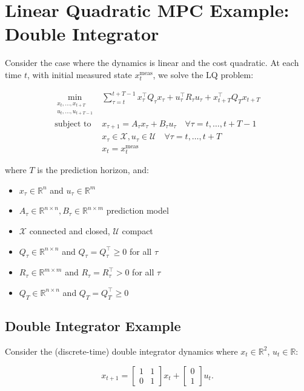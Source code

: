 \documentclass[openany]{book}
\theoremstyle{definition}
\theoremstyle{remark}
\begin{document}
\section{Linear Quadratic MPC Example: Double Integrator}

Consider the case where the dynamics is linear and the cost quadratic. At each time $t$, with initial measured state $x_t^{\text{meas}}$, we solve the LQ problem:

\begin{align*}
\min_{\substack{x_t,\ldots,x_{t+T} \\ u_t,\ldots,u_{t+T-1}}} & \sum_{\tau=t}^{t+T-1} x_\tau^\top Q_\tau x_\tau + u_\tau^\top R_\tau u_\tau + x_{t+T}^\top Q_T x_{t+T} \\
\text{subject to } & x_{\tau+1} = A_\tau x_\tau + B_\tau u_\tau \quad \forall\tau = t,\ldots,t+T-1 \\
& x_\tau \in \mathcal{X}, u_\tau \in \mathcal{U} \quad \forall\tau = t,\ldots,t+T \\
& x_t = x_t^{\text{meas}}
\end{align*}

where $T$ is the prediction horizon, and:
\begin{itemize}
\item $x_\tau \in \mathbb{R}^n$ and $u_\tau \in \mathbb{R}^m$
\item $A_\tau \in \mathbb{R}^{n \times n}, B_\tau \in \mathbb{R}^{n \times m}$ prediction model
\item $\mathcal{X}$ connected and closed, $\mathcal{U}$ compact
\item $Q_\tau \in \mathbb{R}^{n \times n}$ and $Q_\tau = Q_\tau^\top \geq 0$ for all $\tau$
\item $R_\tau \in \mathbb{R}^{m \times m}$ and $R_\tau = R_\tau^\top > 0$ for all $\tau$
\item $Q_T \in \mathbb{R}^{n \times n}$ and $Q_T = Q_T^\top \geq 0$
\end{itemize}

\subsection{Double Integrator Example}
Consider the (discrete-time) double integrator dynamics where $x_t \in \mathbb{R}^2$, $u_t \in \mathbb{R}$:

\[
x_{t+1} = \begin{bmatrix} 1 & 1 \\ 0 & 1 \end{bmatrix} x_t + \begin{bmatrix} 0 \\ 1 \end{bmatrix} u_t.
\]
\end{document}
